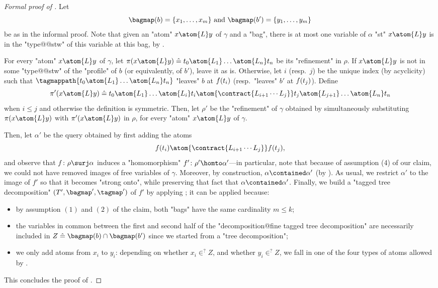 \begin{proof}[Formal proof of ]
    Let
    \[\bagmap(b) = \{x_1,\dotsc, x_m\}
    \text{ and }
    \bagmap(b') =\{y_1,\dotsc,y_m\}
    \]
    be as in the informal proof.
    Note that given an "atom" $x \atom{L} y$ of $\gamma$ and
	a "bag", there is at most
    one variable of $\alpha$ "st" $x \atom{L} y$ is in the "type@@stw" of this variable
	at this bag, by .

    For every "atom" $x \atom{L} y$ of $\gamma$, let 
    $\pi(x \atom{L} y) \defeq t_0 \atom{L_1} \dotsc \atom{L_n} t_n$
    be its "refinement" in $\rho$.
    If $x \atom{L} y$ is not in some "type@@stw" of the "profile" of $b$
    (or equivalently, of $b'$), leave it as is.
    Otherwise, let $i$ (resp.\ $j$) be the unique
    index (by acyclicity) such that
    $\tagmappath{t_0 \atom{L_1} \dotsc \atom{L_n} t_n}$ "leaves" $b$
    at $f(t_i)$ (resp.\ "leaves" $b'$ at $f(t_j)$).
    Define
    \[
		\pi'(x \atom{L} y) \defeq
        t_0 \atom{L_1} \dotsc \atom{L_i} t_i \atom{\contract{L_{i+1}\cdots L_j}}
        t_j \atom{L_{j+1}} \dotsc \atom{L_n} t_n
    \]
    when $i \leq j$ and otherwise the definition is symmetric.
    Then, let $\rho'$ be the "refinement" of $\gamma$ obtained by simultaneously
    substituting $\pi(x \atom{L} y)$ with $\pi'(x\atom{L} y)$  in $\rho$,
    for every "atom" $x\atom{L} y$ of $\gamma$.

    Then, let $\alpha'$ be the query obtained by first
    adding the atoms  
    \[\fun(t_i) \atom{\contract{L_{i+1}\cdots L_j}} \fun(t_j),\]
    and observe that $\fun\colon \rho \surj \alpha$
    induces a "homomorphism" $\fun'\colon \rho' \homto \alpha'$---in particular, note that
	because of assumption (4) of our claim, we could not have removed images of
	free variables of $\gamma$.
    Moreover, by construction, $\alpha \contained \alpha'$ (by ).
	As usual, we restrict $\alpha'$ to the image of $f'$ so that it
	becomes "strong onto", while preserving that fact that $\alpha \contained \alpha'$.
	Finally, we build a "tagged tree decomposition" $(T', \bagmap', \tagmap')$
    of $f'$ by applying ; it can be applied because:
	\begin{itemize}
		\item by assumption $(1)$ and $(2)$ of the claim, both "bags" have the same cardinality $m \leq k$;
		\item the variables in common between the first and second half of the "decomposition@fine tagged tree decomposition" are necessarily included in $Z \defeq \bagmap(b) \cap \bagmap(b')$
		since we started from a "tree decomposition";
		\item we only add atoms from $x_i$ to $y_i$: depending on whether $x_i \in^? Z$,
		and whether $y_i \in^? Z$, we fall in one of the four types of atoms allowed
		by .
	\end{itemize}
	This concludes the proof of .
\end{proof}


